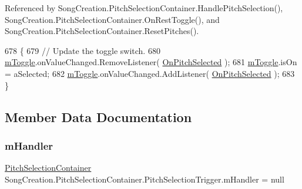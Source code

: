 Referenced by Song\+Creation.\+Pitch\+Selection\+Container.\+Handle\+Pitch\+Selection(), Song\+Creation.\+Pitch\+Selection\+Container.\+On\+Rest\+Toggle(), and Song\+Creation.\+Pitch\+Selection\+Container.\+Reset\+Pitches().


\begin{DoxyCode}
678             \{
679                 \textcolor{comment}{// Update the toggle switch.}
680                 \hyperlink{class_song_creation_1_1_pitch_selection_container_1_1_pitch_selection_trigger_aa289269d96356379b79d3918535561fd}{mToggle}.onValueChanged.RemoveListener( \hyperlink{class_song_creation_1_1_pitch_selection_container_1_1_pitch_selection_trigger_ac113e02950a228fc6c78ad5972238a98}{OnPitchSelected} );
681                 \hyperlink{class_song_creation_1_1_pitch_selection_container_1_1_pitch_selection_trigger_aa289269d96356379b79d3918535561fd}{mToggle}.isOn = aSelected;
682                 \hyperlink{class_song_creation_1_1_pitch_selection_container_1_1_pitch_selection_trigger_aa289269d96356379b79d3918535561fd}{mToggle}.onValueChanged.AddListener( \hyperlink{class_song_creation_1_1_pitch_selection_container_1_1_pitch_selection_trigger_ac113e02950a228fc6c78ad5972238a98}{OnPitchSelected} );
683             \}
\end{DoxyCode}


\subsection{Member Data Documentation}
\mbox{\label{class_song_creation_1_1_pitch_selection_container_1_1_pitch_selection_trigger_aad92d071482ccc179c9a40cada09785b}} 
\subsubsection{\texorpdfstring{m\+Handler}{mHandler}}
{\footnotesize\ttfamily \hyperlink{class_song_creation_1_1_pitch_selection_container}{Pitch\+Selection\+Container} Song\+Creation.\+Pitch\+Selection\+Container.\+Pitch\+Selection\+Trigger.\+m\+Handler = null\hspace{0.3cm}{\ttfamily [private]}}



